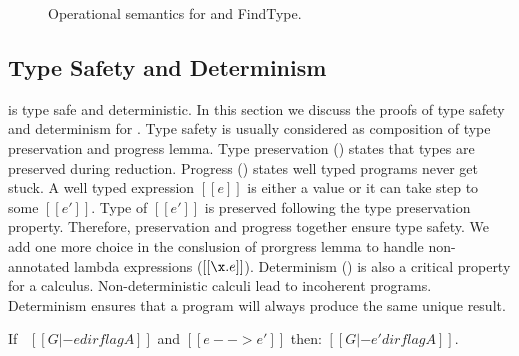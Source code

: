 \begin{figure}[t]
  \begin{small}
    \centering
  \end{small}
  \begin{small}
    \centering
  \end{small}
  \caption{Operational semantics for \cal and FindType.}
  \label{fig:union:os}
\end{figure}


\subsection{Type Safety and Determinism}
\label{sec:union:safety}
\cal is type safe and deterministic. In this section we discuss the
proofs of type safety and determinism for \cal. Type safety is usually considered as composition
of type preservation and progress lemma. Type preservation ()
states that types are preserved during
reduction. Progress () states well typed programs never get stuck.
A well typed expression $[[e]]$ is
either a value or it can take step to some $[[e']]$. Type of $[[e']]$ is preserved following the
type preservation property. Therefore, preservation and progress together ensure type safety.
We add one more choice in the conslusion of prorgress lemma to handle non-annotated lambda expressions
($[[\x.e]]$).
Determinism () is also a critical property for a calculus.
Non-deterministic calculi lead to incoherent programs.
Determinism ensures that a program will always produce the same unique result.

\begin{lemma}
\label{lemma:union:preservation}
  If \ $[[G |- e dirflag A]]$ and $[[e --> e']]$ then: $[[G |- e' dirflag A]]$.
\end{lemma}

